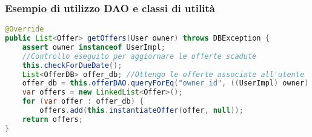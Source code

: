 \begin{frame}[fragile]
    \frametitle{Esempio di utilizzo DAO e classi di utilità}
    \lstset{style=java}
    \begin{lstlisting}[language=java, caption={OfferFactoryImpl\#getOffers()}]
@Override
public List<Offer> getOffers(User owner) throws DBException {
    assert owner instanceof UserImpl;
    //Controllo eseguito per aggiornare le offerte scadute
    this.checkForDueDate();
    List<OfferDB> offer_db; //Ottengo le offerte associate all'utente
    offer_db = this.offerDAO.queryForEq("owner_id", ((UserImpl) owner).getDbData());
    var offers = new LinkedList<Offer>();
    for (var offer : offer_db) {
        offers.add(this.instantiateOffer(offer, null));
    return offers;
}
    \end{lstlisting}
\end{frame}
